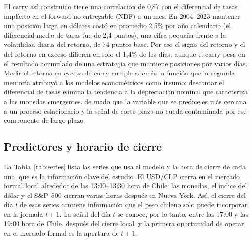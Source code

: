 \documentclass[11pt,a4paper]{article}
\begin{document}
El carry así construido tiene una correlación de 0,87 con el diferencial de tasas implícito en el forward no entregable (NDF) a un mes. En 2004--2023 mantener una posición larga en dólares costó en promedio 2,5\% por año calendario (el diferencial medio de tasas fue de 2,4 puntos), una cifra pequeña frente a la volatilidad diaria del retorno, de 74 puntos base. Por eso el signo del retorno y el del retorno en exceso difieren en solo el 1,4\% de los días, aunque el carry pesa en el resultado acumulado de una estrategia que mantiene posiciones por varios días. Medir el retorno en exceso de carry cumple además la función que la segunda mentoría atribuyó a los modelos econométricos como insumo: descontar el diferencial de tasas elimina la tendencia a la depreciación nominal que caracteriza a las monedas emergentes, de modo que la variable que se predice es más cercana a un proceso estacionario y la señal de corto plazo no queda contaminada por ese componente de largo plazo.

\subsection{Predictores y horario de cierre}

La Tabla~\ref{tab:series} lista las series que usa el modelo y la hora de cierre de cada una, que es la información clave del estudio. El USD/CLP cierra en el mercado formal local alrededor de las 13:00--13:30 hora de Chile; las monedas, el índice del dólar y el S\&P~500 cierran varias horas después en Nueva York. Así, el cierre del día $t$ de esas series contiene información que el peso chileno solo puede incorporar en la jornada $t+1$. La señal del día $t$ se conoce, por lo tanto, entre las 17:00 y las 19:00 hora de Chile, después del cierre local, y la primera oportunidad de operar en el mercado formal es la apertura de $t+1$.
\end{document}

